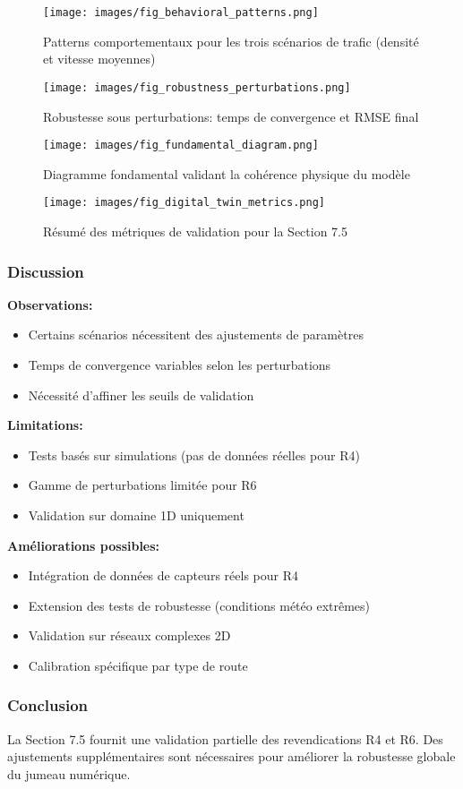 \begin{figure}[htbp]
\centering
\texttt{[image: images/fig\_behavioral\_patterns.png]}
\caption{Patterns comportementaux pour les trois scénarios de trafic (densité et vitesse moyennes)}
\label{fig:behavioral_patterns}
\end{figure}

\begin{figure}[htbp]
\centering
\texttt{[image: images/fig\_robustness\_perturbations.png]}
\caption{Robustesse sous perturbations: temps de convergence et RMSE final}
\label{fig:robustness_perturbations}
\end{figure}

\begin{figure}[htbp]
\centering
\texttt{[image: images/fig\_fundamental\_diagram.png]}
\caption{Diagramme fondamental validant la cohérence physique du modèle}
\label{fig:fundamental_diagram}
\end{figure}

\begin{figure}[htbp]
\centering
\texttt{[image: images/fig\_digital\_twin\_metrics.png]}
\caption{Résumé des métriques de validation pour la Section 7.5}
\label{fig:digital_twin_metrics}
\end{figure}

\subsubsection{Discussion}


\textbf{Observations:}
\begin{itemize}
    \item Certains scénarios nécessitent des ajustements de paramètres
    \item Temps de convergence variables selon les perturbations
    \item Nécessité d'affiner les seuils de validation
\end{itemize}

\textbf{Limitations:}
\begin{itemize}
    \item Tests basés sur simulations (pas de données réelles pour R4)
    \item Gamme de perturbations limitée pour R6
    \item Validation sur domaine 1D uniquement
\end{itemize}

\textbf{Améliorations possibles:}
\begin{itemize}
    \item Intégration de données de capteurs réels pour R4
    \item Extension des tests de robustesse (conditions météo extrêmes)
    \item Validation sur réseaux complexes 2D
    \item Calibration spécifique par type de route
\end{itemize}

\subsubsection{Conclusion}

La Section 7.5 fournit une validation partielle des revendications R4 et R6. Des ajustements supplémentaires sont nécessaires pour améliorer la robustesse globale du jumeau numérique.
